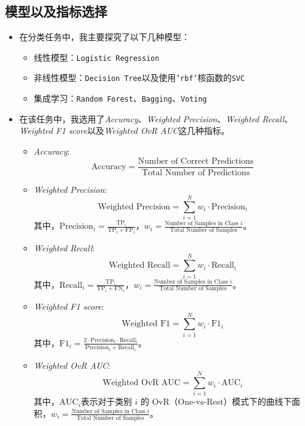 \documentclass[12pt, a4paper, oneside]{ctexart}
\begin{document}
\subsection{模型以及指标选择}
\begin{itemize}
    \item 
    {
        在分类任务中，我主要探究了以下几种模型：
\begin{itemize}
    \item 线性模型：\texttt{Logistic Regression}
    \item 非线性模型：\texttt{Decision Tree}以及使用\texttt{'rbf'}核函数的\texttt{SVC}
    \item 集成学习：\texttt{Random Forest}、\texttt{Bagging}、\texttt{Voting}
\end{itemize}
    }
    \item 
    {
        在该任务中，我选用了\emph{Accuracy}、\emph{Weighted Precision}、\emph{Weighted Recall}、\emph{Weighted F1 score}以及\emph{Weighted OvR AUC}这几种指标。
\begin{itemize}
    \item \emph{Accuracy}: 
    \[
    \text{Accuracy} = \frac{\text{Number of Correct Predictions}}{\text{Total Number of Predictions}}
    \]

    \item \emph{Weighted Precision}:
    \[
    \text{Weighted Precision} = \sum_{i=1}^{N} w_i \cdot \text{Precision}_i
    \]
    其中，\(\text{Precision}_i = \frac{\text{TP}_i}{\text{TP}_i + \text{FP}_i}\)，\(w_i = \frac{\text{Number of Samples in Class } i}{\text{Total Number of Samples}}\)。

    \item \emph{Weighted Recall}:
    \[
    \text{Weighted Recall} = \sum_{i=1}^{N} w_i \cdot \text{Recall}_i
    \]
    其中，\(\text{Recall}_i = \frac{\text{TP}_i}{\text{TP}_i + \text{FN}_i}\)，\(w_i = \frac{\text{Number of Samples in Class } i}{\text{Total Number of Samples}}\)。

    \item \emph{Weighted F1 score}:
    \[
    \text{Weighted F1} = \sum_{i=1}^{N} w_i \cdot \text{F1}_i
    \]
    其中，\(\text{F1}_i = \frac{2 \cdot \text{Precision}_i \cdot \text{Recall}_i}{\text{Precision}_i + \text{Recall}_i}\)。

    \item \emph{Weighted OvR AUC}:
    \[
    \text{Weighted OvR AUC} = \sum_{i=1}^{N} w_i \cdot \text{AUC}_i
    \]
    其中，\(\text{AUC}_i\)表示对于类别 \(i\) 的 OvR（One-vs-Rest）模式下的曲线下面积，\(w_i = \frac{\text{Number of Samples in Class } i}{\text{Total Number of Samples}}\)。
\end{itemize}

    }
\end{itemize}
\end{document}
